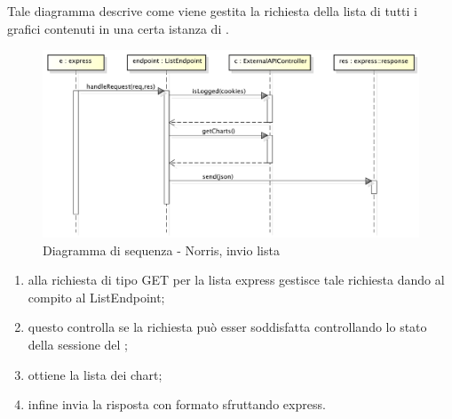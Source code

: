             
        	Tale diagramma descrive come viene gestita la richiesta della lista di tutti i grafici contenuti in una certa istanza di .
            \begin{figure}[H]
                \centering
                \includegraphics[scale=0.3]{DefinizioneDiProdotto/Pics/NorrisInvioLista}
                \caption{Diagramma di sequenza - Norris, invio lista}
            \end{figure}
            \begin{enumerate}
                \item alla richiesta  di tipo GET per la lista express gestisce tale richiesta dando al compito al ListEndpoint;
                \item questo controlla se la richiesta può esser soddisfatta controllando lo stato della sessione del ;
                \item ottiene la lista dei chart;
                \item infine invia la risposta con formato  sfruttando express.
            \end{enumerate}

